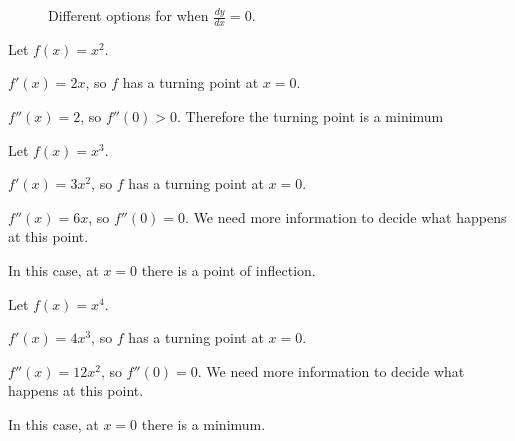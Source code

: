 \begin{in_a_box}
\begin{figure}[H]
    \centering
  \caption{Different options for when $\frac{dy}{dx}=0$.}
  \label{fig:exponent-graphs}
\end{figure}

\end{in_a_box}

\begin{example}
Let $f(x)=x^2$.

$f'(x)=2x$, so $f$ has a turning point at $x=0$.

$f''(x)=2$, so $f''(0)>0$. Therefore the turning point is a minimum
\end{example}
\begin{example}
Let $f(x)=x^3$.

$f'(x)=3x^2$, so $f$ has a turning point at $x=0$.

$f''(x)=6x$, so $f''(0)=0$. We need more information to decide what happens at this point.

In this case, at $x=0$ there is a point of inflection.
\end{example}
\begin{example}
Let $f(x)=x^4$.

$f'(x)=4x^3$, so $f$ has a turning point at $x=0$.

$f''(x)=12x^2$, so $f''(0)=0$. We need more information to decide what happens at this point.

In this case, at $x=0$ there is a minimum.
\end{example}
